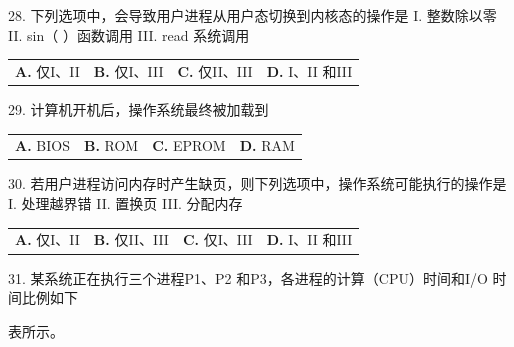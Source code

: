 \documentclass[UTF8,11pt]{ctexart}
\begin{document}
28. 下列选项中，会导致用户进程从用户态切换到内核态的操作是 I. 整数除以零 II. sin（ ）函数调用 III. read 系统调用


\begin{center}\begin{tabular}{>{\raggedright\arraybackslash}p{\dimexpr(\linewidth-8\tabcolsep)/4\relax}>{\raggedright\arraybackslash}p{\dimexpr(\linewidth-8\tabcolsep)/4\relax}>{\raggedright\arraybackslash}p{\dimexpr(\linewidth-8\tabcolsep)/4\relax}>{\raggedright\arraybackslash}p{\dimexpr(\linewidth-8\tabcolsep)/4\relax}}
\textbf{A.} 仅I、II & \textbf{B.} 仅I、III & \textbf{C.} 仅II、III & \textbf{D.} I、II 和III\\[.35em]\end{tabular}\end{center}

29. 计算机开机后，操作系统最终被加载到


\begin{center}\begin{tabular}{>{\raggedright\arraybackslash}p{\dimexpr(\linewidth-8\tabcolsep)/4\relax}>{\raggedright\arraybackslash}p{\dimexpr(\linewidth-8\tabcolsep)/4\relax}>{\raggedright\arraybackslash}p{\dimexpr(\linewidth-8\tabcolsep)/4\relax}>{\raggedright\arraybackslash}p{\dimexpr(\linewidth-8\tabcolsep)/4\relax}}
\textbf{A.} BIOS & \textbf{B.} ROM & \textbf{C.} EPROM & \textbf{D.} RAM\\[.35em]\end{tabular}\end{center}

30. 若用户进程访问内存时产生缺页，则下列选项中，操作系统可能执行的操作是I. 处理越界错 II. 置换页 III. 分配内存


\begin{center}\begin{tabular}{>{\raggedright\arraybackslash}p{\dimexpr(\linewidth-8\tabcolsep)/4\relax}>{\raggedright\arraybackslash}p{\dimexpr(\linewidth-8\tabcolsep)/4\relax}>{\raggedright\arraybackslash}p{\dimexpr(\linewidth-8\tabcolsep)/4\relax}>{\raggedright\arraybackslash}p{\dimexpr(\linewidth-8\tabcolsep)/4\relax}}
\textbf{A.} 仅I、II & \textbf{B.} 仅II、III & \textbf{C.} 仅I、III & \textbf{D.} I、II 和III\\[.35em]\end{tabular}\end{center}

31. 某系统正在执行三个进程P1、P2 和P3，各进程的计算（CPU）时间和I/O 时间比例如下


表所示。
\end{document}
